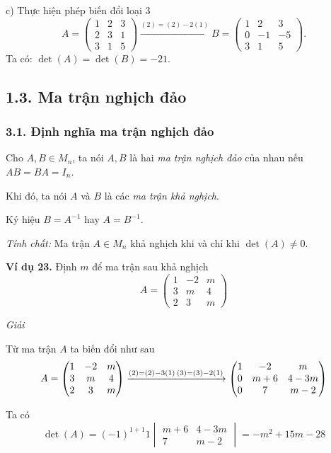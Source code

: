 c) Thực hiện phép biến đổi loại 3
\[
A = \begin{pmatrix}
1 & 2 & 3 \\
2 & 3 & 1 \\
3 & 1 & 5
\end{pmatrix} \xrightarrow{(2)=(2)-2(1)} B = \begin{pmatrix}
1 & 2 & 3 \\
0 & -1 & -5 \\
3 & 1 & 5
\end{pmatrix}.
\]
Ta có: \(\det(A) = \det(B) = -21\).

\subsection*{1.3. Ma trận nghịch đảo}

\subsubsection*{3.1. Định nghĩa ma trận nghịch đảo}
Cho \( A, B \in M_n \), ta nói \( A, B \) là hai \textit{ma trận nghịch đảo} của nhau nếu \( AB = BA = I_n \).

Khi đó, ta nói \( A \) và \( B \) là các \textit{ma trận khả nghịch}.

Ký hiệu \( B = A^{-1} \) hay \( A = B^{-1} \).

\textit{Tính chất:} Ma trận \( A \in M_n \) khả nghịch khi và chỉ khi \(\det(A) \neq 0\).

\textbf{Ví dụ 23.} Định \( m \) để ma trận sau khả nghịch
\[
A = \begin{pmatrix}
1 & -2 & m \\
3 & m & 4 \\
2 & 3 & m
\end{pmatrix}
\]

\textit{Giải}

Từ ma trận \( A \) ta biến đổi như sau
\[
A = \begin{pmatrix}
1 & -2 & m \\
3 & m & 4 \\
2 & 3 & m
\end{pmatrix}
\xrightarrow{(2)=(2)-3(1) \\ (3)=(3)-2(1)}
\begin{pmatrix}
1 & -2 & m \\
0 & m+6 & 4-3m \\
0 & 7 & m-2
\end{pmatrix}
\]

Ta có
\[
\det(A) = (-1)^{1+1} 1 \begin{vmatrix}
m+6 & 4-3m \\
7 & m-2
\end{vmatrix} = -m^2 + 15m - 28
\]


